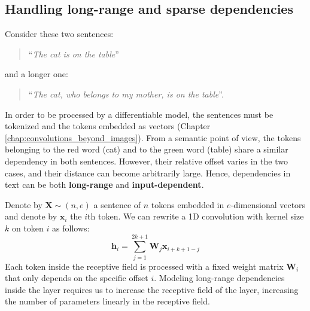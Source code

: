 \subsection{Handling long-range and sparse dependencies}

Consider these two sentences: 
%
\begin{quote}
“\textit{The {\color{drawred}cat} is on the {\color{drawgreen}table}}”
\end{quote}
%
and a longer one:
%
\begin{quote}
“\textit{The {\color{drawred}cat}, who belongs to my mother, is on the {\color{drawgreen}table}}”.
\end{quote}
%
In order to be processed by a differentiable model, the sentences must be tokenized and the tokens embedded as vectors (Chapter \ref{chap:convolutions_beyond_images}). From a semantic point of view, the tokens belonging to the red word ({\color{drawred}cat}) and to the green word ({\color{drawgreen}table}) share a similar dependency in both sentences. However, their relative offset varies in the two cases, and their distance can become arbitrarily large. Hence, dependencies in text can be both \textbf{long-range} and \textbf{input-dependent}.

Denote by $\mathbf{X} \sim (n, e)$ a sentence of $n$ tokens embedded in $e$-dimensional vectors and denote by $\mathbf{x}_i$ the $i$th token. We can rewrite a 1D convolution with kernel size $k$ on token $i$ as follows:
%
\begin{equation}
\mathbf{h}_i=\sum_{j=1}^{2k+1}\mathbf{W}_j \mathbf{x}_{i+k+1-j}
\label{eq:conv_1d}
\end{equation}
%
Each token inside the receptive field is processed with a fixed weight matrix $\mathbf{W}_i$ that only depends on the specific offset $i$. Modeling long-range dependencies inside the layer requires us to increase the receptive field of the layer, increasing the number of parameters linearly in the receptive field. 

